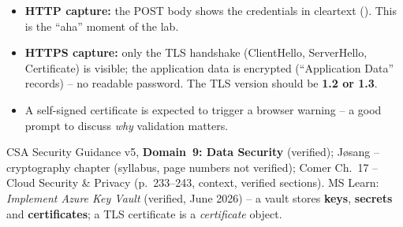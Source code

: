 \documentclass[11pt]{article}
\begin{document}
\begin{itemize}
\item \textbf{HTTP capture:} the POST body shows the credentials in cleartext
      (). This is the ``aha'' moment of the lab.
\item \textbf{HTTPS capture:} only the TLS handshake (ClientHello, ServerHello, Certificate) is
      visible; the application data is encrypted (``Application Data'' records) -- no readable
      password. The TLS version should be \textbf{1.2 or 1.3}.
\item A self-signed certificate is expected to trigger a browser warning -- a good prompt to discuss
      \emph{why} validation matters.
\end{itemize}

CSA Security Guidance v5, \textbf{Domain~9: Data Security} (verified); J\o sang -- cryptography chapter
(syllabus, page numbers not verified); Comer Ch.~17 -- Cloud Security \& Privacy (p.~233--243, context,
verified sections). MS Learn: \emph{Implement Azure Key Vault} (verified, June 2026) -- a vault stores
\textbf{keys}, \textbf{secrets} and \textbf{certificates}; a TLS certificate is a \emph{certificate}
object.
\end{document}
